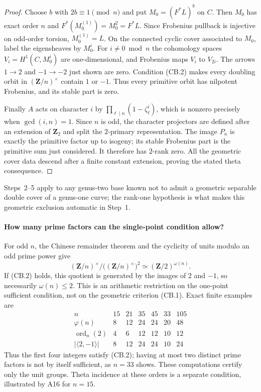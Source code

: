 \begin{proof}
Choose $b$ with $2b\equiv1\pmod n$ and put $M_0=(F^*L)^b$ on $C$.
Then $M_0$ has exact order $n$ and
$F^*(M_0^{(1)})=M_0^2=F^*L$. Since Frobenius pullback is
injective on odd-order torsion, $M_0^{(1)}=L$. On the connected
cyclic cover associated to $M_0$, label the eigensheaves by $M_0^i$.
For $i\ne0\bmod n$ the cohomology spaces
$V_i=H^1(C,M_0^i)$ are one-dimensional, and Frobenius maps
$V_i$ to $V_{2i}$. The arrows $1\to2$ and $-1\to-2$ just shown
are zero. Condition (CB.2) makes every doubling orbit in
$(\mathbf Z/n)^\times$ contain $1$ or $-1$. Thus every primitive
orbit has nilpotent Frobenius, and its stable part is zero.

Finally $A$ acts on character $i$ by
$\prod_{\ell\mid n}(1-\zeta_\ell^i)$, which is nonzero precisely
when $\gcd(i,n)=1$. Since $n$ is odd, the character projectors are
defined after an extension of $\mathbf Z_2$ and split the
$2$-primary representation. The image $P_n$ is exactly the
primitive factor up to isogeny; its stable Frobenius part is the
primitive sum just considered. It therefore has $2$-rank zero.
All the geometric cover data descend after a finite constant
extension, proving the stated theta consequence.
\end{proof}

Steps~2--5 apply to any genus-two base known not to admit a geometric
separable double cover of a genus-one curve; the rank-one hypothesis
is what makes this geometric exclusion automatic in Step~1.

\paragraph{How many prime factors can the single-point condition allow?}
For odd $n$, the Chinese remainder theorem and the cyclicity of units
modulo an odd prime power give
\[
 (\mathbf Z/n)^\times/\bigl((\mathbf Z/n)^\times\bigr)^2
                  \simeq (\mathbf Z/2)^{\omega(n)}.
\]
If (CB.2) holds, this quotient is generated by the images of $2$ and
$-1$, so necessarily $\omega(n)\le2$. This is an arithmetic
restriction on the one-point sufficient condition, not on the
geometric criterion (CB.1). Exact finite examples are
\[
\begin{array}{c|rrrrrr}
 n&15&21&35&45&33&105\\ \hline
 \varphi(n)&8&12&24&24&20&48\\
 \operatorname{ord}_n(2)&4&6&12&12&10&12\\
 |\langle2,-1\rangle|&8&12&24&24&10&24
\end{array}
\]
Thus the first four integers satisfy (CB.2); having at most two
distinct prime factors is not by itself sufficient, as $n=33$ shows.
These computations certify only the unit groups. Theta incidence at
these orders is a separate condition, illustrated by A16 for $n=15$.


